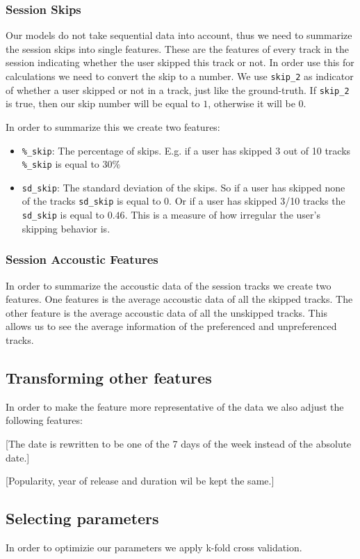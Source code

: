 \documentclass[conference]{IEEEtran}
\begin{document}
\subsubsection{Session Skips}
Our models do not take sequential data into account, 
thus we need to summarize the session skips into single features. 
These are the features of every track in the session indicating whether the user skipped this track or not.
In order use this for calculations we need to convert the skip to a number. 
We use \verb|skip_2| as indicator of whether a user skipped or not in a track, 
just like the ground-truth. 
If \verb|skip_2| is true, then our skip number will be equal to $1$, 
otherwise it will be $0$.

In order to summarize this we create two features:
\begin{itemize}
	\item \verb|%_skip|: The percentage of skips. 
		E.g. if a user has skipped 3 out of 10 tracks \verb|%_skip| is equal to $30\%$
	\item \verb|sd_skip|: The standard deviation of the skips. 
	So if a user has skipped none of the tracks \verb|sd_skip| is equal to 0. 
	Or if a user has skipped 3/10 tracks the \verb|sd_skip| is equal to $0.46$.
	This is a measure of how irregular the user's skipping behavior is.
\end{itemize}


\subsubsection{Session Accoustic Features}
In order to summarize the accoustic data of the session tracks we create two features. 
One features is the average accoustic data of all the skipped tracks. 
The other feature is the average accoustic data of all the unskipped tracks.
This allows us to see the average information of the preferenced and unpreferenced tracks.

\subsection{Transforming other features}
In order to make the feature more representative of the data we also adjust the following features:

[The date is rewritten to be one of the 7 days of the week instead of the absolute date.]

[Popularity, year of release and duration wil be kept the same.]

\subsection{Selecting parameters}
In order to optimizie our parameters we apply k-fold cross validation.
\end{document}
